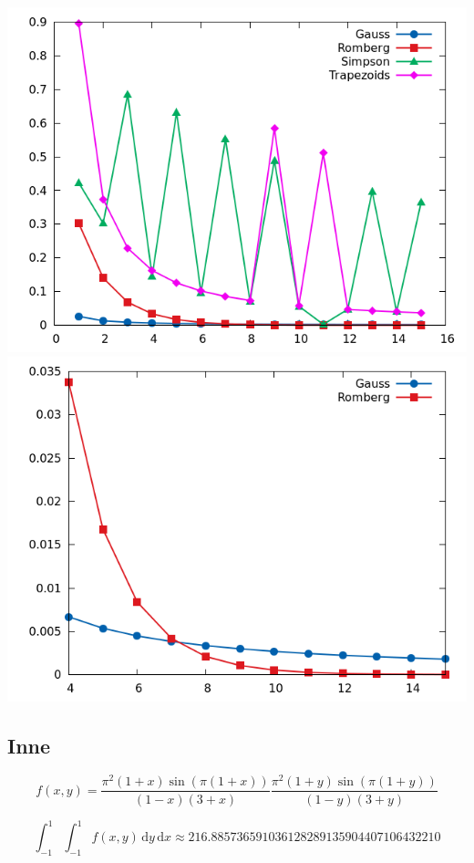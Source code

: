 \documentclass[11pt,leqno]{article}
\newcommand{\dvar}[1]{\,\mathrm{d}#1}
\begin{document}
\begin{center}
\includegraphics[scale=0.55,natwidth=640,natheight=480]{plot/testa4_15e.png}\\
\includegraphics[scale=0.55,natwidth=640,natheight=480]{plot/testa4_15ezoom.png}
\end{center}


\subsection{Inne}
\[
  f(x, y)
=
  \frac{\pi^2 (1 + x) \sin(\pi (1 + x))}{(1 - x)(3 + x)}
  \frac{\pi^2 (1 + y) \sin(\pi (1 + y))}{(1 - y)(3 + y)}
\]

\[
  \int_{-1}^{1} \int_{-1}^{1} f(x, y) \dvar{y} \dvar{x}
\approx
  216.885736591036128289135904407106432210
\]
\end{document}
